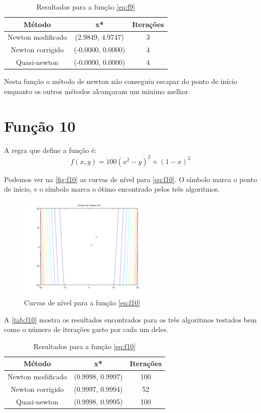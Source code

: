 \documentclass[12pt]{article}
\begin{document}
\begin{table}[H]
\centering
\begin{tabular}{*3c}
\toprule
Método			&	x*		&	Iterações\\
\midrule
Newton modificado	&	(2.9849, 4.9747)	&	3\\
Newton corrigido	&	(-0.0000, 0.0000)	&	4\\
Quasi-newton		&	(-0.0000, 0.0000)	&	4\\
\bottomrule
\end{tabular}
\caption{\small{Resultados para a função \autoref{eq:f9} }}
\label{tab:f9}
\end{table}

Nesta função o método de newton não conseguiu escapar do ponto de início enquanto os outros métodos alcançaram um minimo melhor.

\section{Função 10}
A regra que define a função é:
\begin{equation}
\label{eq:f10}
f(x, y) = 100(x^2 -y)^2 + (1 - x)^2
\end{equation}

Podemos ver na \autoref{fig:f10} as curvas de nível para \autoref{eq:f10}. O símbolo \textit{\textopenbullet} marca o ponto de início,
e o símbolo \textit{\texttimes} marca o ótimo encontrado pelos três algoritmos.

\begin{figure}[H]
  \centering
  \includegraphics[width=250px]{../matlab/images/f10_contour}
  \caption{Curvas de nível para a função \autoref{eq:f10}}
  \label{fig:f10}
\end{figure}

A \autoref{tab:f10} mostra os resultados encontrados para os três algoritmos testados bem como o número de iterações gasto por cada um deles.

\begin{table}[H]
\centering
\begin{tabular}{*3c}
\toprule
Método			&	x*		&	Iterações\\
\midrule
Newton modificado	&	(0.9998, 0.9997)	&	100\\
Newton corrigido	&	(0.9997, 0.9994)	&	52\\
Quasi-newton		&	(0.9998, 0.9995)	&	100\\
\bottomrule
\end{tabular}
\caption{\small{Resultados para a função \autoref{eq:f10} }}
\label{tab:f10}
\end{table}
\end{document}
